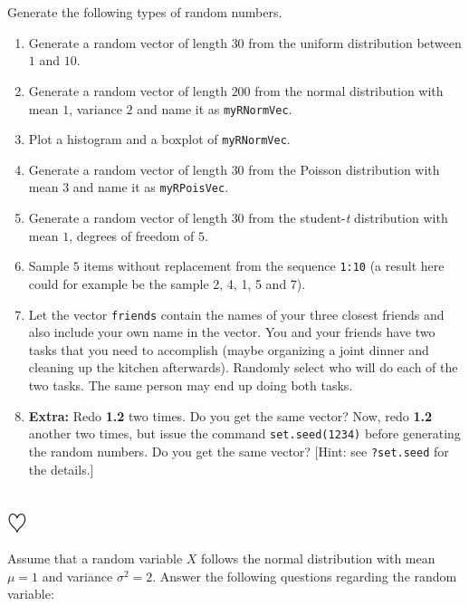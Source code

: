 \documentclass[a4paper]{article}
\begin{document}
\section{}
Generate the following types of random numbers.
\begin{enumerate}
\item Generate a random vector of length $30$ from the uniform distribution between $1$
  and $10$.

\item Generate a random vector of length $200$ from the normal distribution with
  mean $1$, variance $2$ and name it as \texttt{myRNormVec}.

\item Plot a histogram and a boxplot of \texttt{myRNormVec}.

\item Generate a random vector of length $30$ from the Poisson distribution with
  mean $3$ and name it as \texttt{myRPoisVec}.

\item Generate a random vector of length $30$ from the student-\emph{t}
  distribution with mean $1$, degrees of freedom of $5$.

\item Sample $5$ items without replacement from the sequence
  \texttt{1:10} (a result here could for example be the sample 2, 4, 1, 5 and 7). 

\item Let the vector \texttt{friends} contain the names of your three closest
  friends and also include your own name in the vector. You and your friends have two
  tasks that you need to accomplish (maybe organizing a joint dinner and cleaning up the kitchen afterwards). Randomly select who will do each of the two tasks. The same person may end
  up doing both tasks.

\item \textbf{Extra:} Redo \textbf{1.2}  two times. Do you get the same vector?
  Now, redo \textbf{1.2} another two times, but issue the command
  \texttt{set.seed(1234)} before generating the random numbers. Do you get the same vector?
  [Hint: see \texttt{?set.seed} for the details.]

\end{enumerate}

\section{$\heartsuit$}
 Assume that a random variable $X$ follows the normal distribution with mean $\mu=1$ and
 variance $\sigma^2=2$. Answer the following questions regarding the random variable: 
\end{document}
